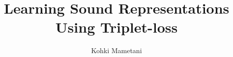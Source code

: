 \documentclass[a4paper,12pt,twoside]{report}
\begin{document}

\title{Learning Sound Representations Using Triplet-loss}
\author{Kohki Mametani}

\maketitle

\maketitle
\restoregeometry

\preface
\cleardoublepage 




\body





% 

\listoffigures
\newpage
\listoftables




% 
\end{document}

